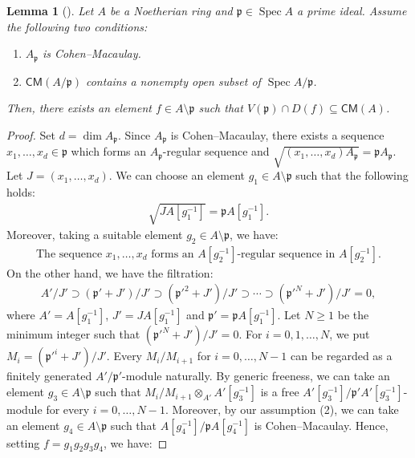 \documentclass[a4paper, 11pt]{amsart}
\newtheorem{lemma}[theorem]{Lemma}
\theoremstyle{definition}
\newcommand{\Spec}{\operatorname{Spec}}
\let\subset\subseteq
\begin{document}
\begin{lemma}[{\cite[Lemma 2.1]{Tak07}}]\label{lem:lem1-1}
    Let $A$ be a Noetherian ring and $\mathfrak{p} \in \Spec A$ a prime ideal. Assume the following two conditions:
    \begin{enumerate}
        \item $A_\mathfrak{p}$ is Cohen--Macaulay. 
        \item $\mathsf{CM}(A/\mathfrak{p})$ contains a nonempty open subset of $\Spec A/\mathfrak{p}$. 
    \end{enumerate}
    Then, there exists an element $f \in A \setminus \mathfrak{p}$ such that $V(\mathfrak{p}) \cap D(f) \subset \mathsf{CM}(A)$. 
\end{lemma}
\begin{proof}
    Set $d = \dim A_\mathfrak{p}$. Since $A_\mathfrak{p}$ is Cohen--Macaulay, there exists a sequence $x_1, \ldots, x_d \in \mathfrak{p}$ which forms an $A_\mathfrak{p}$-regular sequence and $\sqrt{(x_1, \ldots, x_d)A_\mathfrak{p}} = \mathfrak{p}A_\mathfrak{p}$. Let $J = (x_1, \ldots, x_d)$. We can choose an element $g_1 \in A \setminus \mathfrak{p}$ such that the following holds:
    \begin{align*}
        \sqrt{JA[g_1^{-1}]} = \mathfrak{p}A[g_1^{-1}]. 
    \end{align*}
    Moreover, taking a suitable element $g_2 \in A \setminus \mathfrak{p}$, we have: 
    \begin{align*}
        \text{The sequence } x_1,\ldots, x_d \text{ forms an } A[g_2^{-1}] \text{-regular sequence in } A[g_2^{-1}]. 
    \end{align*}    
    On the other hand, we have the filtration:
    \begin{align*}
        A'/J' \supset (\mathfrak{p}' + J')/J' \supset (\mathfrak{p}'^2 + J')/J' \supset \cdots \supset (\mathfrak{p}'^N + J')/J' = 0, 
    \end{align*}
    where $A' = A[g_1^{-1}]$, $J' = JA[g_1^{-1}]$ and $\mathfrak{p}' = \mathfrak{p}A[g_1^{-1}]$. Let $N \geq 1$ be the minimum integer such that $(\mathfrak{p}'^N + J')/J' = 0$. For $i = 0, 1, \ldots, N$, we put $M_i = (\mathfrak{p}'^i + J')/J'$. Every $M_i/M_{i+1}$ for $i = 0, \ldots, N-1$ can be regarded as a finitely generated $A'/\mathfrak{p}'$-module naturally. By generic freeness, we can take an element $g_3 \in A \setminus \mathfrak{p}$ such that $M_i/M_{i+1} \otimes_{A'} A'[g_3^{-1}]$ is a free $A'[g_3^{-1}]/\mathfrak{p}'A'[g_3^{-1}]$-module for every $i = 0, \ldots, N-1$. Moreover, by our assumption (2), we can take an element $g_4 \in A \setminus \mathfrak{p}$ such that $A[g_4^{-1}]/\mathfrak{p}A[g_4^{-1}]$ is Cohen--Macaulay. Hence, setting $f = g_1g_2g_3g_4$, we have:

\end{proof}
\end{document}
